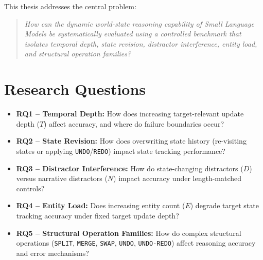 \documentclass{iutbscthesis}
\begin{document}
This thesis addresses the central problem:
\begin{quote}
\textit{How can the dynamic world-state reasoning capability of Small Language Models be systematically evaluated using a controlled benchmark that isolates temporal depth, state revision, distractor interference, entity load, and structural operation families?}
\end{quote}

\section{Research Questions}
\begin{itemize}
    \item \textbf{RQ1 -- Temporal Depth:} How does increasing target-relevant update depth ($T$) affect accuracy, and where do failure boundaries occur?
    \item \textbf{RQ2 -- State Revision:} How does overwriting state history (re-visiting states or applying \texttt{UNDO}/\texttt{REDO}) impact state tracking performance?
    \item \textbf{RQ3 -- Distractor Interference:} How do state-changing distractors ($D$) versus narrative distractors ($N$) impact accuracy under length-matched controls?
    \item \textbf{RQ4 -- Entity Load:} Does increasing entity count ($E$) degrade target state tracking accuracy under fixed target update depth?
    \item \textbf{RQ5 -- Structural Operation Families:} How do complex structural operations (\texttt{SPLIT}, \texttt{MERGE}, \texttt{SWAP}, \texttt{UNDO}, \texttt{UNDO-REDO}) affect reasoning accuracy and error mechanisms?
\end{itemize}
\end{document}
